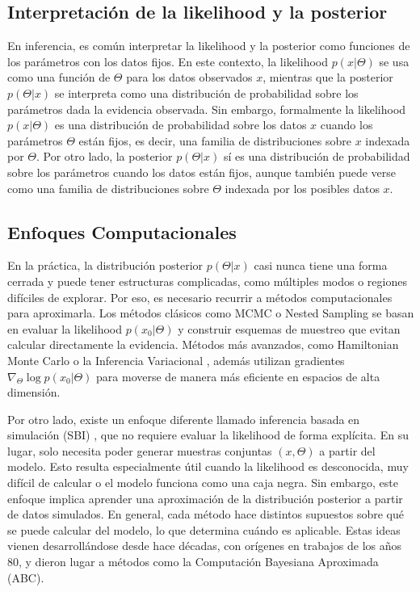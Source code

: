 \subsection{Interpretación de la likelihood y la posterior}

En inferencia, es común interpretar la likelihood y la posterior como funciones de los parámetros con los datos fijos. En este contexto, la likelihood $p(x|\Theta)$ se usa como una función de $\Theta$ para los datos observados $x$, mientras que la posterior $p(\Theta|x)$ se interpreta como una distribución de probabilidad sobre los parámetros dada la evidencia observada. Sin embargo, formalmente la likelihood $p(x|\Theta)$ es una distribución de probabilidad sobre los datos $x$ cuando los parámetros $\Theta$ están fijos, es decir, una familia de distribuciones sobre $x$ indexada por $\Theta$. Por otro lado, la posterior $p(\Theta|x)$ sí es una distribución de probabilidad sobre los parámetros cuando los datos están fijos, aunque también puede verse como una familia de distribuciones sobre $\Theta$ indexada por los posibles datos $x$.

\subsection{Enfoques Computacionales}

En la práctica, la distribución posterior $p(\Theta|x)$ casi nunca tiene una forma cerrada y puede tener estructuras complicadas, como múltiples modos o regiones difíciles de explorar. Por eso, es necesario recurrir a métodos computacionales para aproximarla. Los métodos clásicos como MCMC \cite{hasting1970} o Nested Sampling \cite{skilling2004} se basan en evaluar la likelihood $p(x_0|\Theta)$ y construir esquemas de muestreo que evitan calcular directamente la evidencia. Métodos más avanzados, como Hamiltonian Monte Carlo \cite{brooks2011} o la Inferencia Variacional \cite{hoffman2013}, además utilizan gradientes $\nabla_\Theta \log p(x_0|\Theta)$ para moverse de manera más eficiente en espacios de alta dimensión.

Por otro lado, existe un enfoque diferente llamado inferencia basada en simulación (SBI) \cite{cranmer2020}, que no requiere evaluar la likelihood de forma explícita. En su lugar, solo necesita poder generar muestras conjuntas $(x, \Theta)$ a partir del modelo. Esto resulta especialmente útil cuando la likelihood es desconocida, muy difícil de calcular o el modelo funciona como una caja negra. Sin embargo, este enfoque implica aprender una aproximación de la distribución posterior a partir de datos simulados. En general, cada método hace distintos supuestos sobre qué se puede calcular del modelo, lo que determina cuándo es aplicable. Estas ideas vienen desarrollándose desde hace décadas, con orígenes en trabajos de los años 80, y dieron lugar a métodos como la Computación Bayesiana Aproximada (ABC).

